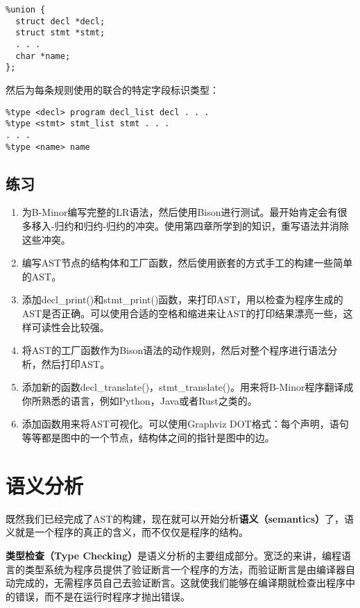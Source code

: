 \documentclass[cn,11pt,chinese]{elegantbook}
\begin{document}
\begin{verbatim}
%union {
  struct decl *decl;
  struct stmt *stmt;
  . . .
  char *name;
};
\end{verbatim}

然后为每条规则使用的联合的特定字段标识类型：

\begin{verbatim}
%type <decl> program decl_list decl . . .
%type <stmt> stmt_list stmt . . .
. . .
%type <name> name
\end{verbatim}

\section{练习}

\begin{enumerate}
  \item 为B-Minor编写完整的LR语法，然后使用Bison进行测试。最开始肯定会有很多移入-归约和归约-归约的冲突。使用第四章所学到的知识，重写语法并消除这些冲突。
  \item 编写AST节点的结构体和工厂函数，然后使用嵌套的方式手工的构建一些简单的AST。
  \item 添加decl\_print()和stmt\_print()函数，来打印AST，用以检查为程序生成的AST是否正确。可以使用合适的空格和缩进来让AST的打印结果漂亮一些，这样可读性会比较强。
  \item 将AST的工厂函数作为Bison语法的动作规则，然后对整个程序进行语法分析，然后打印AST。
  \item 添加新的函数decl\_translate()，stmt\_translate()。用来将B-Minor程序翻译成你所熟悉的语言，例如Python，Java或者Rust之类的。
  \item 添加函数用来将AST可视化。可以使用Graphviz DOT格式：每个声明，语句等等都是图中的一个节点，结构体之间的指针是图中的边。
\end{enumerate}

\chapter{语义分析}

既然我们已经完成了AST的构建，现在就可以开始分析\textbf{语义（semantics）}了，语义就是一个程序的真正的含义，而不仅仅是程序的结构。

\textbf{类型检查（Type Checking）}是语义分析的主要组成部分。宽泛的来讲，编程语言的类型系统为程序员提供了验证断言一个程序的方法，而验证断言是由编译器自动完成的，无需程序员自己去验证断言。这就使我们能够在编译期就检查出程序中的错误，而不是在运行时程序才抛出错误。
\end{document}
